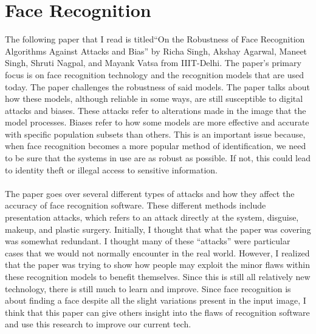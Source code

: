 \documentclass[12pt,journal,compsoc]{IEEEtran}
\begin{document}
\section{Face Recognition}
The following paper that I read is titled“On the Robustness of Face Recognition Algorithms Against Attacks and Bias” by Richa Singh, Akshay Agarwal, Maneet Singh, Shruti Nagpal, and Mayank Vatsa from IIIT-Delhi. The paper's primary focus is on face recognition technology and the recognition models that are used today. The paper challenges the robustness of said models. The paper talks about how these models, although reliable in some ways, are still susceptible to digital attacks and biases. These attacks refer to alterations made in the image that the model processes. Biases refer to how some models are more effective and accurate with specific population subsets than others. This is an important issue because, when face recognition becomes a more popular method of identification, we need to be sure that the systems in use are as robust as possible. If not, this could lead to identity theft or illegal access to sensitive information. \\\\
The paper goes over several different types of attacks and how they affect the accuracy of face recognition software. These different methods include presentation attacks, which refers to an attack directly at the system, disguise, makeup, and plastic surgery. Initially, I thought that what the paper was covering was somewhat redundant. I thought many of these “attacks” were particular cases that we would not normally encounter in the real world. However, I realized that the paper was trying to show how people may exploit the minor flaws within these recognition models to benefit themselves. Since this is still all relatively new technology, there is still much to learn and improve. Since face recognition is about finding a face despite all the slight variations present in the input image, I think that this paper can give others insight into the flaws of recognition software and use this research to improve our current tech.
\newpage
\end{document}
